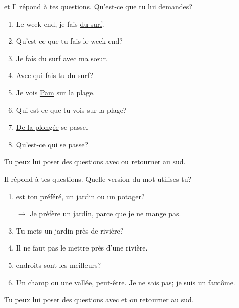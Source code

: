 \documentclass{beamer}
\begin{document}
  \begin{frame}{ et }
    \hypertarget{que}{}
    Il répond à tes questions.
    Qu'est-ce que tu lui demandes?
    \begin{enumerate}
      \item Le week-end, je fais \underline{du surf}.
      \item<2->[$\to$] Qu'est-ce que tu fais le week-end?
      \item<3-> Je fais du surf avec \underline{ma sœur}.
      \item<4->[$\to$] Avec qui fais-tu du surf?
      \item<5-> Je vois \underline{Pam} sur la plage.
      \item<6->[$\to$] Qui est-ce que tu vois sur la plage?
      \item<7-> \underline{De la plongée} se passe.
      \item<8->[$\to$] Qu'est-ce qui se passe?
    \end{enumerate}
    Tu peux lui poser des questions avec \hyperlink{quel}{} ou retourner \hyperlink{début}{au sud}.
  \end{frame}

  \begin{frame}{}
    \hypertarget{quel}{}
    Il répond à tes questions.
    Quelle version du mot  utilises-tu?
    \begin{enumerate}
      \item \underline{} est ton préféré, un jardin ou un potager?
      \item[$\to$] Je préfère un jardin, parce que je ne mange pas.
      \item<3-> Tu mets un jardin près de \underline{} rivière?
      \item<3->[$\to$] Il ne faut pas le mettre près d'une rivière.
      \item<5-> \underline{} endroits sont les meilleurs?
      \item<5->[$\to$] Un champ ou une vallée, peut-être. Je ne sais pas; je suis un fantôme.
    \end{enumerate}
    Tu peux lui poser des questions avec \hyperlink{que}{ et } ou retourner \hyperlink{début}{au sud}.
  \end{frame}
\end{document}
